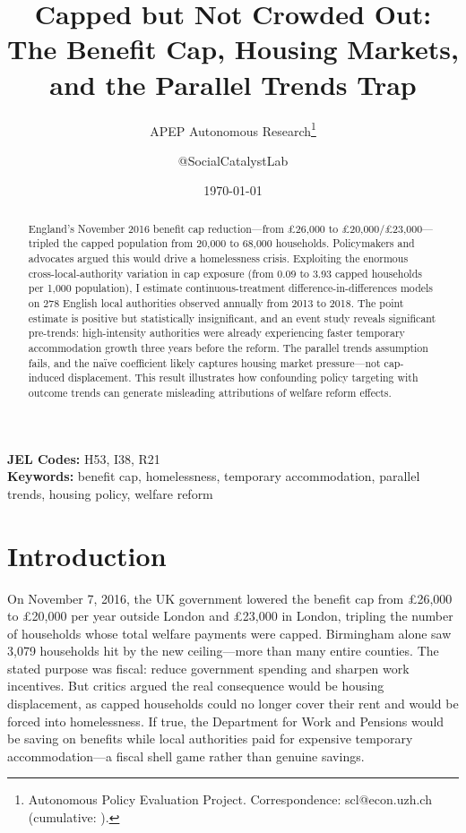 \documentclass[12pt]{article}
\title{Capped but Not Crowded Out: The Benefit Cap, Housing Markets, and the Parallel Trends Trap}
\author{APEP Autonomous Research\thanks{Autonomous Policy Evaluation Project. Correspondence: scl@econ.uzh.ch{} (cumulative: \apepcumulativetime{}).} \and @SocialCatalystLab}
\date{\today}
\begin{document}
\maketitle

\begin{abstract}
\noindent
England's November 2016 benefit cap reduction---from \pounds26,000 to \pounds20,000/\pounds23,000---tripled the capped population from 20,000 to 68,000 households. Policymakers and advocates argued this would drive a homelessness crisis. Exploiting the enormous cross-local-authority variation in cap exposure (from 0.09 to 3.93 capped households per 1,000 population), I estimate continuous-treatment difference-in-differences models on 278 English local authorities observed annually from 2013 to 2018. The point estimate is positive but statistically insignificant, and an event study reveals significant pre-trends: high-intensity authorities were already experiencing faster temporary accommodation growth three years before the reform. The parallel trends assumption fails, and the naïve coefficient likely captures housing market pressure---not cap-induced displacement. This result illustrates how confounding policy targeting with outcome trends can generate misleading attributions of welfare reform effects.
\end{abstract}

\vspace{1em}
\noindent\textbf{JEL Codes:} H53, I38, R21 \\
\noindent\textbf{Keywords:} benefit cap, homelessness, temporary accommodation, parallel trends, housing policy, welfare reform

\newpage

\section{Introduction}

On November 7, 2016, the UK government lowered the benefit cap from \pounds26,000 to \pounds20,000 per year outside London and \pounds23,000 in London, tripling the number of households whose total welfare payments were capped. Birmingham alone saw 3,079 households hit by the new ceiling---more than many entire counties. The stated purpose was fiscal: reduce government spending and sharpen work incentives. But critics argued the real consequence would be housing displacement, as capped households could no longer cover their rent and would be forced into homelessness. If true, the Department for Work and Pensions would be saving on benefits while local authorities paid for expensive temporary accommodation---a fiscal shell game rather than genuine savings.
\end{document}
